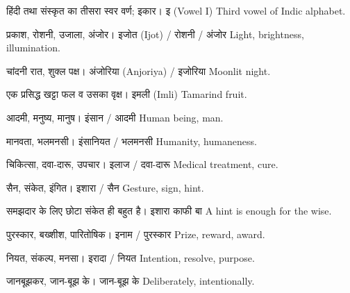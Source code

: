 
%
{हिंदी तथा संस्कृत का तीसरा स्वर वर्ण; इकार।}%
{इ (Vowel I)}%
{Third vowel of Indic alphabet.}

%
{प्रकाश, रोशनी, उजाला, अंजोर।}%
{इजोत (Ijot) / रोशनी / अंजोर}%
{Light, brightness, illumination.}

%
{चांदनी रात, शुक्ल पक्ष।}%
{अंजोरिया (Anjoriya) / इजोरिया}%
{Moonlit night.}

%
{एक प्रसिद्ध खट्टा फल व उसका वृक्ष।}%
{इमली (Imli)}%
{Tamarind fruit.}

%
{आदमी, मनुष्य, मानुष।}%
{इंसान / आदमी}%
{Human being, man.}

%
{मानवता, भलमनसी।}%
{इंसानियत / भलमनसी}%
{Humanity, humaneness.}

%
{चिकित्सा, दवा-दारू, उपचार।}%
{इलाज / दवा-दारू}%
{Medical treatment, cure.}

%
{सैन, संकेत, इंगित।}%
{इशारा / सैन}%
{Gesture, sign, hint.}

%
{समझदार के लिए छोटा संकेत ही बहुत है।}%
{इशारा काफी बा}%
{A hint is enough for the wise.}

%
{पुरस्कार, बख्शीश, पारितोषिक।}%
{इनाम / पुरस्कार}%
{Prize, reward, award.}

%
{नियत, संकल्प, मनसा।}%
{इरादा / नियत}%
{Intention, resolve, purpose.}

%
{जानबूझकर, जान-बूझ के।}%
{जान-बूझ के}%
{Deliberately, intentionally.}

